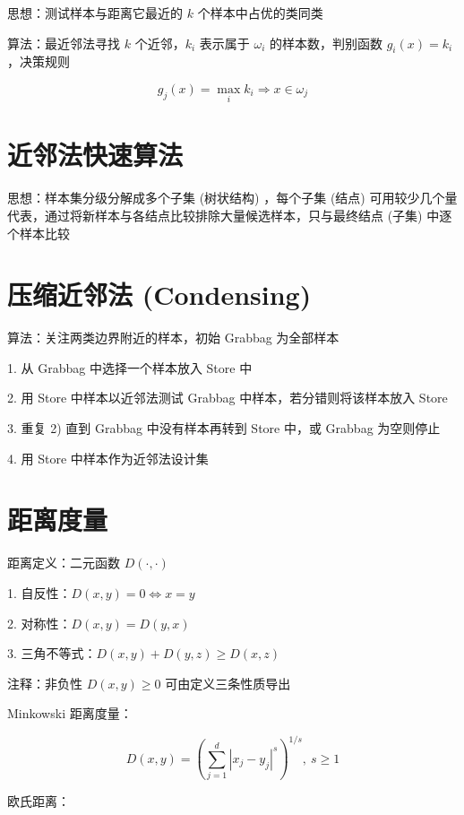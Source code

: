 \documentclass[openany,a4paper,12pt]{ctexbook}
\theoremstyle{kaiti}
\theoremstyle{normal}
\begin{document}
思想：测试样本与距离它最近的 $k$ 个样本中占优的类同类

算法：最近邻法寻找 $k$ 个近邻，$k_i$ 表示属于 $\omega_i$ 的样本数，判别函数 $g_i(x)=k_i$，决策规则

\begin{equation}
g_j(x)=\max_ik_i\Rightarrow x\in \omega_j
\end{equation}

\section{近邻法快速算法}

思想：样本集分级分解成多个子集 (树状结构) ，每个子集 (结点) 可用较少几个量代表，通过将新样本与各结点比较排除大量候选样本，只与最终结点 (子集) 中逐个样本比较

\section{压缩近邻法 (Condensing) }

算法：关注两类边界附近的样本，初始 Grabbag 为全部样本

1. 从 Grabbag 中选择一个样本放入 Store 中

2. 用 Store 中样本以近邻法测试 Grabbag 中样本，若分错则将该样本放入 Store

3. 重复 2) 直到 Grabbag 中没有样本再转到 Store 中，或 Grabbag 为空则停止

4. 用 Store 中样本作为近邻法设计集

\section{距离度量}

距离定义：二元函数 $D\left(\cdot ,\cdot \right)$

1. 自反性：$D\left(x,y \right)=0\Leftrightarrow x=y$

2. 对称性：$D\left(x,y \right)=D\left(y,x \right)$

3. 三角不等式：$D\left(x,y \right)+D\left(y,z \right)\geqslant D\left(x,z \right)$

注释：非负性 $D\left(x,y \right)\geqslant 0$ 可由定义三条性质导出

Minkowski 距离度量：

\begin{equation}
D\left(x,y \right)=\left(\sum_{j=1}^{d}|x_j-y_j|^s \right)^{1/s},~s\geqslant 1
\end{equation}

欧氏距离：
\end{document}
